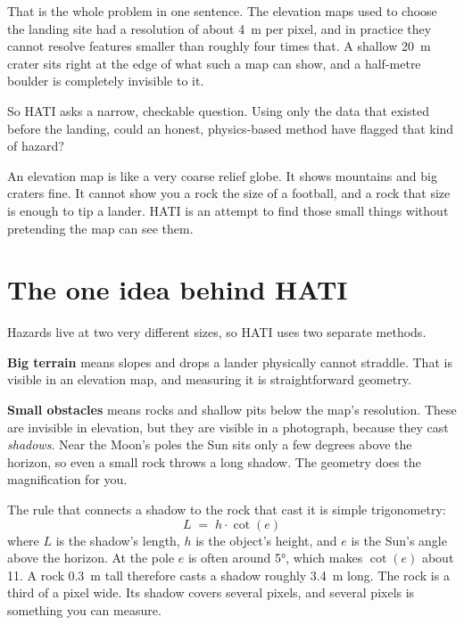 \documentclass[11pt]{article}
\begin{document}
That is the whole problem in one sentence. The elevation maps used to choose the
landing site had a resolution of about \SI{4}{\meter} per pixel, and in practice they
cannot resolve features smaller than roughly four times that. A shallow
\SI{20}{\meter} crater sits right at the edge of what such a map can show, and a
half-metre boulder is completely invisible to it.

So HATI asks a narrow, checkable question. Using only the data that existed before
the landing, could an honest, physics-based method have flagged that kind of hazard?

\begin{plainbox}
An elevation map is like a very coarse relief globe. It shows mountains and big
craters fine. It cannot show you a rock the size of a football, and a rock that size
is enough to tip a lander. HATI is an attempt to find those small things without
pretending the map can see them.
\end{plainbox}

\section{The one idea behind HATI}

Hazards live at two very different sizes, so HATI uses two separate methods.

\textbf{Big terrain} means slopes and drops a lander physically cannot straddle. That
is visible in an elevation map, and measuring it is straightforward geometry.

\textbf{Small obstacles} means rocks and shallow pits below the map's resolution.
These are invisible in elevation, but they are visible in a photograph, because they
cast \emph{shadows}. Near the Moon's poles the Sun sits only a few degrees above the
horizon, so even a small rock throws a long shadow. The geometry does the
magnification for you.

The rule that connects a shadow to the rock that cast it is simple trigonometry:
\begin{equation}
L \;=\; h \cdot \cot(e)
\label{eq:shadow}
\end{equation}
where $L$ is the shadow's length, $h$ is the object's height, and $e$ is the Sun's
angle above the horizon. At the pole $e$ is often around \ang{5}, which makes
$\cot(e)$ about \num{11}. A rock \SI{0.3}{\meter} tall therefore casts a shadow
roughly \SI{3.4}{\meter} long. The rock is a third of a pixel wide. Its shadow covers
several pixels, and several pixels is something you can measure.
\end{document}
